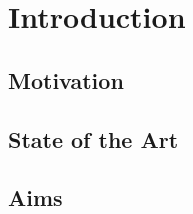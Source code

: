%

\chapter{Introduction}
\label{Ch:Introduction}
\section{Motivation}
\section{State of the Art}
\section{Aims}

%
%


